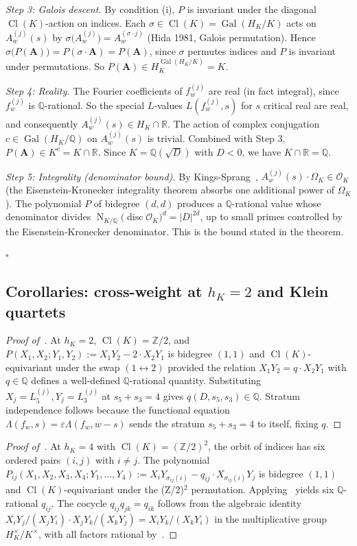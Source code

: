 \documentclass[11pt]{amsart}
\theoremstyle{definition}
\theoremstyle{remark}
\DeclareMathOperator{\Cl}{Cl}
\DeclareMathOperator{\Gal}{Gal}
\DeclareMathOperator{\Nm}{N}
\DeclareMathOperator{\disc}{disc}
\newcommand{\Q}{\mathbb{Q}}
\newcommand{\Z}{\mathbb{Z}}
\newcommand{\R}{\mathbb{R}}
\newcommand{\OK}{\mathcal{O}_K}
\newcommand{\HK}{H_K}
\begin{document}
\emph{Step 3: Galois descent.}
By condition (i), $P$ is invariant under the diagonal $\Cl(K)$-action
on indices. Each $\sigma \in \Cl(K) = \Gal(\HK/K)$ acts on
$A_w^{(j)}(s)$ by $\sigma\bigl(A_w^{(j)}\bigr) = A_w^{(\sigma \cdot j)}$
(Hida 1981, Galois permutation). Hence
$\sigma\bigl(P(\mathbf{A})\bigr) = P(\sigma \cdot \mathbf{A}) =
P(\mathbf{A})$, since $\sigma$ permutes indices and $P$ is invariant
under permutations. So $P(\mathbf{A}) \in \HK^{\Gal(\HK/K)} = K$.

\emph{Step 4: Reality.}
The Fourier coefficients of $f_w^{(j)}$ are real (in fact integral),
since $f_w^{(j)}$ is $\Q$-rational. So the special $L$-values
$L(f_w^{(j)}, s)$ for $s$ critical real are real, and consequently
$A_w^{(j)}(s) \in \HK \cap \R$. The action of complex conjugation
$c \in \Gal(\HK/\Q)$ on $A_w^{(j)}(s)$ is trivial. Combined with
Step 3, $P(\mathbf{A}) \in K^c = K \cap \R$. Since $K = \Q(\sqrt{D})$
with $D < 0$, we have $K \cap \R = \Q$.

\emph{Step 5: Integrality (denominator bound).}
By Kings-Sprang~\cite{KingsSprang2025}, $A_w^{(j)}(s) \cdot
\Omega_K \in \OK$ (the Eisenstein-Kronecker integrality theorem
absorbs one additional power of $\Omega_K$). The polynomial $P$ of
bidegree $(d,d)$ produces a $\Q$-rational value whose denominator
divides
$\Nm_{K/\Q}\bigl(\disc\OK \bigr)^d = |D|^{2d}$,
up to small primes controlled by the Eisenstein-Kronecker
denominator. This is the bound stated in the theorem.

\hfill$\square$

\subsection{Corollaries: cross-weight at $h_K = 2$ and Klein quartets}
\label{ss:corollaries-proof}
\begin{proof}[Proof of~]
At $h_K = 2$, $\Cl(K) = \Z/2$, and $P(X_1, X_2; Y_1, Y_2) := X_1 Y_2
- 2 \cdot X_2 Y_1$ is bidegree $(1,1)$ and $\Cl(K)$-equivariant under
the swap $(1 \leftrightarrow 2)$ provided the relation
$X_1 Y_2 = q \cdot X_2 Y_1$ with $q \in \Q$ defines a well-defined
$\Q$-rational quantity. Substituting
$X_j = L_5^{(j)}, Y_j = L_3^{(j)}$ at $s_5 + s_3 = 4$ gives
$q(D, s_5, s_3) \in \Q$. Stratum independence follows because the
functional equation $\Lambda(f_w, s) = \varepsilon \Lambda(f_w, w - s)$
sends the stratum $s_5 + s_3 = 4$ to itself, fixing $q$.
\end{proof}

\begin{proof}[Proof of~]
At $h_K = 4$ with $\Cl(K) = (\Z/2)^2$, the orbit of indices has six
ordered pairs $(i,j)$ with $i \neq j$. The polynomial
$P_{ij}(X_1, X_2, X_3, X_4; Y_1, \dots, Y_4) := X_i Y_{\sigma_{ij}(i)}
- q_{ij} \cdot X_{\sigma_{ij}(i)} Y_j$
is bidegree $(1,1)$ and $\Cl(K)$-equivariant under the (Z/2)$^2$
permutation. Applying~ yields six $\Q$-rational
$q_{ij}$. The cocycle $q_{ij} q_{jk} = q_{ik}$ follows from the
algebraic identity $X_i Y_j / (X_j Y_i) \cdot X_j Y_k / (X_k Y_j) =
X_i Y_k / (X_k Y_i)$ in the multiplicative group $\HK^\times / K^\times$,
with all factors rational by~.
\end{proof}
\end{document}
